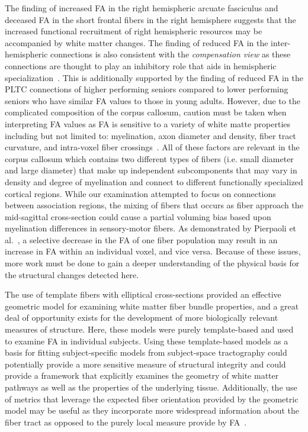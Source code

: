 The finding of increased FA in the right hemispheric arcuate fasciculus and deceased FA in the short frontal fibers in the right hemisphere suggests that the increased functional recruitment of right hemispheric resources may be accompanied by white matter changes. The finding of reduced FA in the inter-hemispheric connections is also consistent with the \emph{compensation view} as these connections are thought to play an inhibitory role that aids in hemispheric specialization~\cite{Yazgan1995}. This is additionally supported by the finding of reduced FA in the PLTC connections of higher performing seniors compared to lower performing seniors who have similar FA values to those in young adults. However, due to the complicated composition of the corpus callosum, caution must be taken when interpreting FA values as FA is sensitive to a variety of white matte properties including but not limited to: myelination, axon diameter and density, fiber tract curvature, and intra-voxel fiber crossings~\cite{Barkovich2000,Shimony1999,Virta1999}. All of these factors are relevant in the corpus callosum which contains two different types of fibers (i.e. small diameter and large diameter) that make up independent subcomponents that may vary in density and degree of myelination and connect to different functionally specialized cortical regions. While our examination attempted to focus on connections between association regions, the mixing of fibers that occurs as fiber approach the mid-sagittal cross-section could cause a partial voluming bias based upon myelination differences in sensory-motor fibers. As demonstrated by Pierpaoli et al.\ \cite{Pierpaoli2001}, a selective decrease in the FA of one fiber population may result in an increase in FA within an individual voxel, and vice versa. Because of these issues, more work must be done to gain a deeper understanding of the physical basis for the structural changes detected here.

The use of template fibers with elliptical cross-sections provided an effective geometric model for examining white matter fiber bundle properties, and a great deal of opportunity exists for the development of more biologically relevant measures of structure. Here, these models were purely template-based and used to examine FA in individual subjects. Using these template-based models as a basis for fitting subject-specific models from subject-space tractography could potentially provide a more sensitive measure of structural integrity and could provide a framework that explicitly examines the geometry of white matter pathways as well as the properties of the underlying tissue. Additionally, the use of metrics that leverage the expected fiber orientation provided by the geometric model may be useful as they incorporate more widespread information about the fiber tract as opposed to the purely local measure provide by FA~\cite{duda08miccai}.

